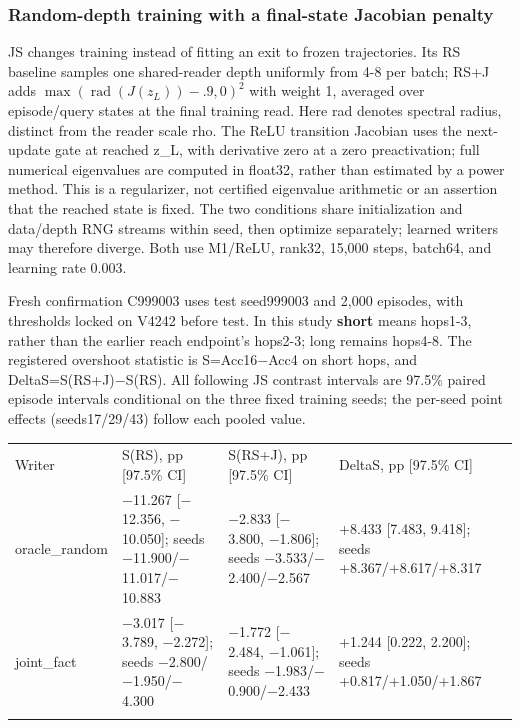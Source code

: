 \subsubsection*{Random-depth training with a final-state Jacobian penalty}

JS changes training instead of fitting an exit to frozen trajectories. Its RS
baseline samples one shared-reader depth uniformly from 4-8 per batch; RS+J adds
\(\max(\operatorname{rad}(J(z_L))-.9,0)^2\) with weight 1, averaged over episode/\allowbreak{}query
states at the final training read. Here rad denotes  %
spectral radius, distinct from the reader scale rho. The ReLU transition Jacobian
uses the next-update gate at reached z\_L, with derivative zero at a zero preactivation;
full numerical eigenvalues are computed in float32, rather than estimated by a power
method. This is a regularizer, not certified eigenvalue arithmetic or  %
an assertion that the reached state is fixed. The two conditions share  %
initialization and data/\allowbreak{}depth RNG streams within seed, then optimize separately;
learned writers may therefore diverge. Both use M1/\allowbreak{}ReLU, rank32,  %
15,000 steps, batch64, and learning rate 0.003.  %

Fresh confirmation C999003 uses test seed999003 and 2,000 episodes, with thresholds
locked on V4242 before test. In this study \textbf{short} means  %
hops1-3, rather than the earlier reach endpoint’s hops2-3; long remains hops4-8.
 The registered overshoot statistic is S=Acc16\ensuremath{-}Acc4 on short  %
hops, and DeltaS=S(RS+J)\ensuremath{-}S(RS). All following JS contrast intervals are  %
97.5\% paired episode intervals conditional on the three fixed training seeds; the
per-seed point effects (seeds17/\allowbreak{}29/\allowbreak{}43) follow each pooled value.


{\footnotesize
\setlength{\tabcolsep}{3pt}
\begin{longtable}{W{90}{8}W{314}{8}W{304}{8}W{292}{8}}
\toprule
Writer & S(RS), pp [97.5\% CI] & S(RS+J), pp [97.5\% CI] & DeltaS, pp [97.5\% CI] \\ \addlinespace[3pt]
\midrule \endhead
oracle\_random & \ensuremath{-}11.267 [\ensuremath{-}12.356, \ensuremath{-}10.050]; seeds \ensuremath{-}11.900/\allowbreak{}\ensuremath{-}11.017/\allowbreak{}\ensuremath{-}10.883 & \ensuremath{-}2.833 [\ensuremath{-}3.800, \ensuremath{-}1.806]; seeds \ensuremath{-}3.533/\allowbreak{}\ensuremath{-}2.400/\allowbreak{}\ensuremath{-}2.567 & +8.433 [7.483, 9.418]; seeds +8.367/\allowbreak{}+8.617/\allowbreak{}+8.317 \\ \addlinespace[3pt]  %
joint\_fact & \ensuremath{-}3.017 [\ensuremath{-}3.789, \ensuremath{-}2.272]; seeds \ensuremath{-}2.800/\allowbreak{}\ensuremath{-}1.950/\allowbreak{}\ensuremath{-}4.300 & \ensuremath{-}1.772 [\ensuremath{-}2.484, \ensuremath{-}1.061]; seeds \ensuremath{-}1.983/\allowbreak{}\ensuremath{-}0.900/\allowbreak{}\ensuremath{-}2.433 & +1.244 [0.222, 2.200]; seeds +0.817/\allowbreak{}+1.050/\allowbreak{}+1.867 \\ \addlinespace[3pt]  %
\bottomrule
\end{longtable}
}



